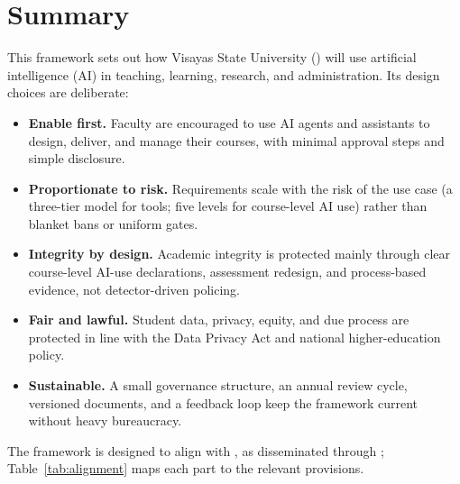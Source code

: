 \section*{Summary}

This framework sets out how Visayas State University (\vsu) will use artificial intelligence (AI) in teaching, learning, research, and administration. Its design choices are deliberate:

\begin{itemize}
  \item \textbf{Enable first.} Faculty are encouraged to use AI agents and assistants to design, deliver, and manage their courses, with minimal approval steps and simple disclosure.
  \item \textbf{Proportionate to risk.} Requirements scale with the risk of the use case (a three-tier model for tools; five levels for course-level AI use) rather than blanket bans or uniform gates.
  \item \textbf{Integrity by design.} Academic integrity is protected mainly through clear course-level AI-use declarations, assessment redesign, and process-based evidence, not detector-driven policing.
  \item \textbf{Fair and lawful.} Student data, privacy, equity, and due process are protected in line with the Data Privacy Act and national higher-education policy.
  \item \textbf{Sustainable.} A small governance structure, an annual review cycle, versioned documents, and a feedback loop keep the framework current without heavy bureaucracy.
\end{itemize}

The framework is designed to align with \cmo{}, as disseminated through \rmo{}; Table~\ref{tab:alignment} maps each part to the relevant provisions.
